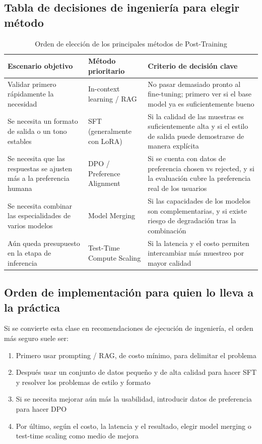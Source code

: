 \documentclass[a4paper]{article}
\begin{document}
\subsection{Tabla de decisiones de ingeniería para elegir método}

\begin{table}[H]
\centering
\begin{tabular}{p{} p{} p{}}
\toprule
Escenario objetivo & Método prioritario & Criterio de decisión clave \\
\midrule
Validar primero rápidamente la necesidad & In-context learning / RAG & No pasar demasiado pronto al fine-tuning; primero ver si el base model ya es suficientemente bueno \\
Se necesita un formato de salida o un tono estables & SFT (generalmente con LoRA) & Si la calidad de las muestras es suficientemente alta y si el estilo de salida puede demostrarse de manera explícita \\
Se necesita que las respuestas se ajusten más a la preferencia humana & DPO / Preference Alignment & Si se cuenta con datos de preferencia chosen vs rejected, y si la evaluación cubre la preferencia real de los usuarios \\
Se necesita combinar las especialidades de varios modelos & Model Merging & Si las capacidades de los modelos son complementarias, y si existe riesgo de degradación tras la combinación \\
Aún queda presupuesto en la etapa de inferencia & Test-Time Compute Scaling & Si la latencia y el costo permiten intercambiar más muestreo por mayor calidad \\
\bottomrule
\end{tabular}
\caption{Orden de elección de los principales métodos de Post-Training}
\end{table}

\subsection{Orden de implementación para quien lo lleva a la práctica}

Si se convierte esta clase en recomendaciones de ejecución de ingeniería, el orden más seguro suele ser:

\begin{enumerate}
    \item Primero usar prompting / RAG, de costo mínimo, para delimitar el problema
    \item Después usar un conjunto de datos pequeño y de alta calidad para hacer SFT y resolver los problemas de estilo y formato
    \item Si se necesita mejorar aún más la usabilidad, introducir datos de preferencia para hacer DPO
    \item Por último, según el costo, la latencia y el resultado, elegir model merging o test-time scaling como medio de mejora
\end{enumerate}
\end{document}
